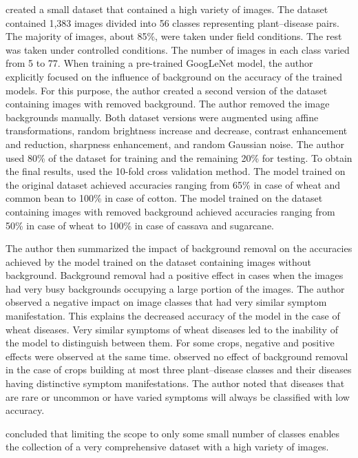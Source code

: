 \documentclass{BachelorBUI}
\begin{document}
        \textcite{Barbedo:2018:1} created a small dataset that contained a high variety of images. The dataset contained 1,383 images divided into 56 classes representing plant--disease pairs. The majority of images, about 85\%, were taken under field conditions. The rest was taken under controlled conditions. The number of images in each class varied from 5 to 77. When training a pre-trained GoogLeNet model, the author explicitly focused on the influence of background on the accuracy of the trained models. For this purpose, the author created a second version of the dataset containing images with removed background. The author removed the image backgrounds manually. Both dataset versions were augmented using affine transformations, random brightness increase and decrease, contrast enhancement and reduction, sharpness enhancement, and random Gaussian noise. The author used 80\% of the dataset for training and the remaining 20\% for testing. To obtain the final results, \textcite{Barbedo:2018:1} used the 10-fold cross validation method. The model trained on the original dataset achieved accuracies ranging from 65\% in case of wheat and common bean to 100\% in case of cotton. The model trained on the dataset containing images with removed background achieved accuracies ranging from 50\% in case of wheat to 100\% in case of cassava and sugarcane. 
        
        The author then summarized the impact of background removal on the accuracies achieved by the model trained on the dataset containing images without background. Background removal had a positive effect in cases when the images had very busy backgrounds occupying a large portion of the images. The author observed a negative impact on image classes that had very similar symptom manifestation. This explains the decreased accuracy of the model in the case of wheat diseases. Very similar symptoms of wheat diseases led to the inability of the model to distinguish between them. For some crops, negative and positive effects were observed at the same time. \textcite{Barbedo:2018:1} observed no effect of background removal in the case of crops building at most three plant--disease classes and their diseases having distinctive symptom manifestations. The author noted that diseases that are rare or uncommon or have varied symptoms will always be classified with low accuracy.

        \textcite{Barbedo:2018:1} concluded that limiting the scope to only some small number of classes enables the collection of a very comprehensive dataset with a high variety of images. 
\end{document}
